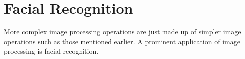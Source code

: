 \section{Facial Recognition}
More complex image processing operations are just made up of simpler image operations such as those mentioned earlier. 
A prominent application of image processing is facial recognition. 
